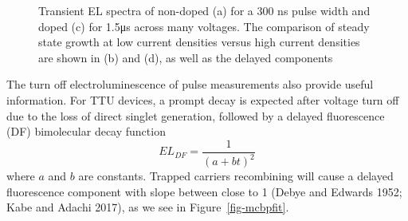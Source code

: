 \documentclass[
  letterpaper,
  DIV=11,
  numbers=noendperiod,
  oneside]{scrreprt}
\begin{document}
\begin{figure}
\begin{minipage}[t]{0.50\linewidth}
{{}

}

\subcaption{\label{fig-mcbppzoom}}
\end{minipage}%

\caption{\label{fig-pulse}Transient EL spectra of non-doped (a) for a
300 ns pulse width and doped (c) for 1.5{μs} across many voltages. The
comparison of steady state growth at low current densities versus high
current densities are shown in (b) and (d), as well as the delayed
components}

\end{figure}

The turn off electroluminescence of pulse measurements also provide
useful information. For TTU devices, a prompt decay is expected after
voltage turn off due to the loss of direct singlet generation, followed
by a delayed fluorescence (DF) bimolecular decay function
\[EL_{DF} = \frac{1}{(a+bt)^2}\] where \(a\) and \(b\) are constants.
Trapped carriers recombining will cause a delayed fluorescence component
with slope between close to 1 (Debye and Edwards 1952; Kabe and Adachi
2017), as we see in Figure~\ref{fig-mcbpfit}.
\end{document}
